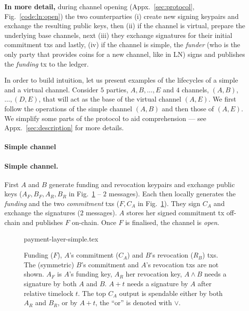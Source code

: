   \textbf{In more detail,} during channel opening (Appx.~\ref{sec:protocol},
  Fig.~\ref{code:ln:open}) the two counterparties (i) create new signing keypairs and
  exchange the resulting public keys, then (ii) if the channel is
  virtual, prepare the underlying base channels, next (iii) they exchange
  signatures for their initial commitment txs
  and lastly, (iv) if the channel is simple, the \emph{funder} (who is the only
  party that provides coins for a new channel, like in LN) signs and publishes
  the \emph{funding} tx to the ledger.

  In order to build intuition, let us present examples of the
  lifecycles of a simple and a virtual channel. Consider $5$ parties, $A, B,
  \dots, E$ and $4$ channels, $(A, B)$, $\dots,(D, E)$, that will act as
  the base of the virtual channel $(A, E)$. We first follow the operations of
  the simple channel $(A, B)$ and then those of $(A, E)$. We simplify some parts
  of the protocol to aid comprehension --- see Appx.~\ref{sec:description} for
  more details.

  \makeatletter%
    {\paragraph{Simple channel}}%
    {\paragraph{Simple channel.}}%
  \makeatother%
  First $A$ and $B$ generate funding and revocation keypairs and exchange
  public keys ($A_F, B_F, A_R, B_R$ in Fig.~\ref{figure:payment-layer-simple} --
  $2$ messages). Each then
  locally generates the \emph{funding} and the two \emph{commitment} txs
  ($F, C_A$ in Fig.~\ref{figure:payment-layer-simple}). They
  sign $C_A$ and exchange the
  signatures ($2$ messages). $A$ stores her
  signed commitment tx off-chain and publishes $F$ on-chain. Once $F$
  is finalised, the channel is \emph{open}.

  \begin{figure}[!htbp]
    \centering
    {payment-layer-simple.tex}
    \caption{Funding ($F$), $A$'s commitment ($C_A$) and $B$'s
    revocation ($R_B$) txs.
    The (symmetric) $B$'s commitment and
    $A$'s revocation txs are not shown.
    $A_F$ is $A$'s funding key, $A_R$ her revocation key, $A \wedge B$ needs
    a signature by both $A$ and $B$. $A+t$ needs a signature
    by $A$ after relative timelock $t$. The top $C_A$ output is
    spendable either by both $A_R$ and $B_R$, or by $A + t$, the ``or'' is denoted with $\vee$.}
    \label{figure:payment-layer-simple}
  \end{figure}

